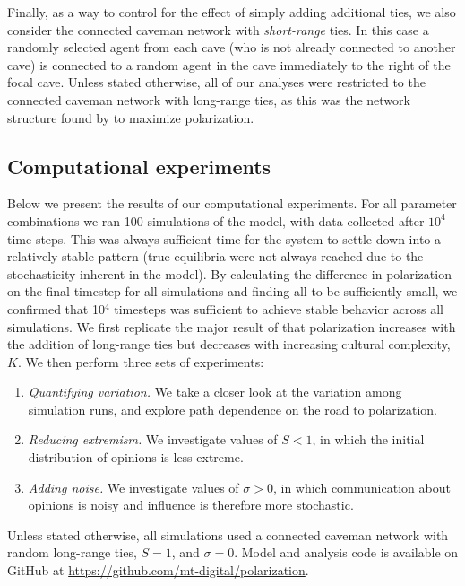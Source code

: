 Finally, as a way to control for the effect of simply adding additional ties, we also consider the connected caveman network with {\em short-range} ties. In this case a randomly selected agent from each cave (who is not already connected to another cave) is
connected to a random agent in the cave immediately to the right of the focal cave. Unless stated otherwise, all of our analyses were restricted to the connected caveman network with long-range ties, as this was the network structure found by  to maximize polarization. 

\subsection{Computational experiments} 
Below we present the results of our computational experiments. For all parameter combinations we ran 100 simulations of the model, with data collected after $10^4$ time steps. This was always sufficient time for the system to settle down into a relatively stable pattern (true equilibria were not always reached due to the stochasticity inherent in the model). By calculating the difference in polarization on the final timestep for all simulations and finding all to be sufficiently small, we confirmed that 10$^4$ timesteps was sufficient to achieve stable behavior across all simulations. 
We first replicate the major result of  that polarization increases with the addition of long-range ties but decreases with increasing cultural complexity, $K$. We then perform three sets of experiments: 
\begin{enumerate}
\item {\em Quantifying variation.} We take a closer look at the variation among simulation runs, and explore path dependence on the road to polarization. 
\item {\em Reducing extremism.} We investigate values of $S < 1$, in which the initial distribution of opinions is less extreme.  
\item {\em Adding noise.} We investigate values of $\sigma > 0$, in which communication about opinions is noisy and influence is therefore more stochastic.  
\end{enumerate}
Unless stated otherwise, all simulations used a connected caveman network with random long-range ties, $S = 1$, and $\sigma = 0$. 
Model and analysis code is available on GitHub at \url{https://github.com/mt-digital/polarization}.


